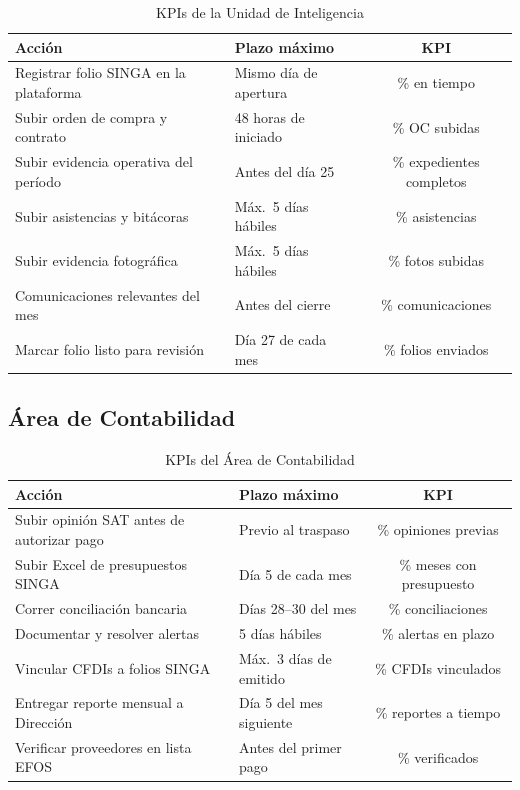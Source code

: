 \documentclass[12pt,a4paper]{article}
\begin{document}
\begin{table}[h!]
\centering
\begin{tabularx}{\textwidth}{Xlc}
\toprule
\textbf{Acci\'on} & \textbf{Plazo m\'aximo} & \textbf{KPI} \\
\midrule
Registrar folio SINGA en la plataforma & Mismo d\'ia de apertura & \% en tiempo \\
Subir orden de compra y contrato & 48 horas de iniciado & \% OC subidas \\
Subir evidencia operativa del per\'iodo & Antes del d\'ia 25 & \% expedientes completos \\
Subir asistencias y bit\'acoras & M\'ax.\ 5 d\'ias h\'abiles & \% asistencias \\
Subir evidencia fotogr\'afica & M\'ax.\ 5 d\'ias h\'abiles & \% fotos subidas \\
Comunicaciones relevantes del mes & Antes del cierre & \% comunicaciones \\
Marcar folio listo para revisi\'on & D\'ia 27 de cada mes & \% folios enviados \\
\bottomrule
\end{tabularx}
\caption{KPIs de la Unidad de Inteligencia}
\end{table}

\subsection{\'Area de Contabilidad}

\begin{table}[h!]
\centering
\begin{tabularx}{\textwidth}{Xlc}
\toprule
\textbf{Acci\'on} & \textbf{Plazo m\'aximo} & \textbf{KPI} \\
\midrule
Subir opini\'on SAT antes de autorizar pago & Previo al traspaso & \% opiniones previas \\
Subir Excel de presupuestos SINGA & D\'ia 5 de cada mes & \% meses con presupuesto \\
Correr conciliaci\'on bancaria & D\'ias 28--30 del mes & \% conciliaciones \\
Documentar y resolver alertas & 5 d\'ias h\'abiles & \% alertas en plazo \\
Vincular CFDIs a folios SINGA & M\'ax.\ 3 d\'ias de emitido & \% CFDIs vinculados \\
Entregar reporte mensual a Direcci\'on & D\'ia 5 del mes siguiente & \% reportes a tiempo \\
Verificar proveedores en lista EFOS & Antes del primer pago & \% verificados \\
\bottomrule
\end{tabularx}
\caption{KPIs del \'Area de Contabilidad}
\end{table}
\end{document}
